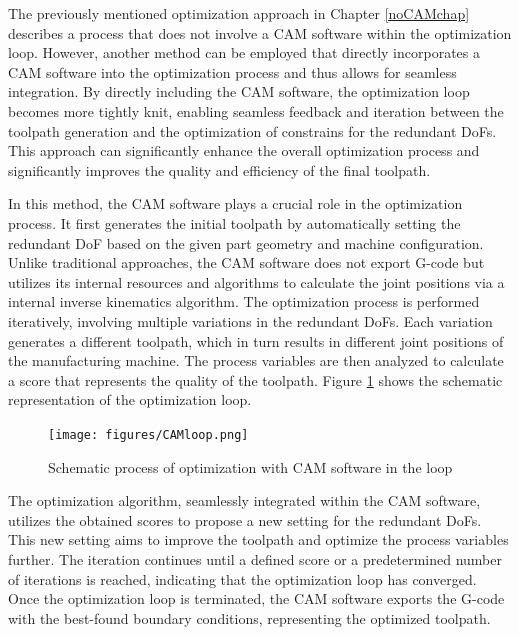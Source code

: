 The previously mentioned optimization approach in Chapter \ref{noCAMchap} describes a process that does not involve a \acrshort{CAM} software within the optimization loop. However, another method can be employed that directly incorporates a \acrshort{CAM} software into the optimization process and thus allows for seamless integration. By directly including the \acrshort{CAM} software, the optimization loop becomes more tightly knit, enabling seamless feedback and iteration between the toolpath generation and the optimization of constrains for the redundant \acrshort{DoF}s. This approach can significantly enhance the overall optimization process and significantly improves the quality and efficiency of the final toolpath.


In this method, the \acrshort{CAM} software plays a crucial role in the optimization process. It first generates the initial toolpath by automatically setting the redundant \acrshort{DoF} based on the given part geometry and machine configuration. Unlike traditional approaches, the \acrshort{CAM} software does not export G-code but utilizes its internal resources and algorithms to calculate the joint positions via a internal inverse kinematics algorithm. The optimization process is performed iteratively, involving multiple variations in the redundant \acrshort{DoF}s. Each variation generates a different toolpath, which in turn results in different joint positions of the manufacturing machine. The process variables are then analyzed to calculate a score that represents the quality of the toolpath. Figure \ref{CAMloop} shows the schematic representation of the optimization loop.\newline

 \begin{figure}[H]
 	\centerline{\texttt{[image: figures/CAMloop.png]}}
 	\caption{Schematic process of optimization with CAM software in the loop}
 	\label{CAMloop}
 \end{figure}



The optimization algorithm, seamlessly integrated within the \acrshort{CAM} software, utilizes the obtained scores to propose a new setting for the redundant \acrshort{DoF}s. This new setting aims to improve the toolpath and optimize the process variables further. The iteration continues until a defined score or a predetermined number of iterations is reached, indicating that the optimization loop has converged.
Once the optimization loop is terminated, the \acrshort{CAM} software exports the G-code with the best-found boundary conditions, representing the optimized toolpath.

